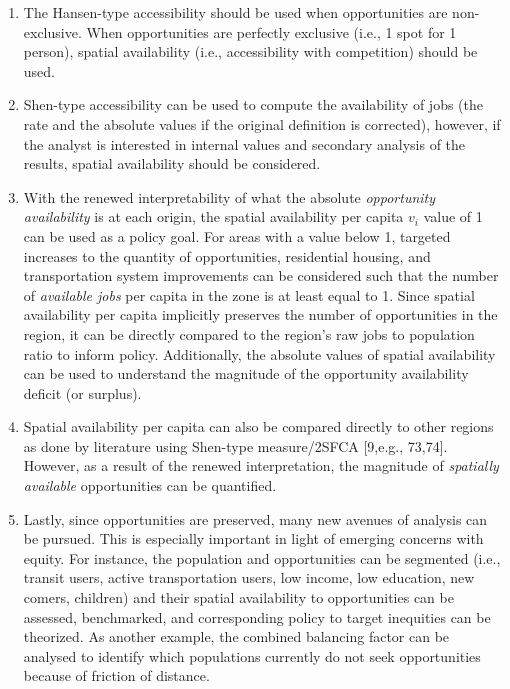 \documentclass[10pt,letterpaper]{article}
\begin{document}
\begin{enumerate}
\def\labelenumi{\arabic{enumi})}
\item
  The Hansen-type accessibility should be used when opportunities are
  non-exclusive. When opportunities are perfectly exclusive (i.e., 1
  spot for 1 person), spatial availability (i.e., accessibility with
  competition) should be used.
\item
  Shen-type accessibility can be used to compute the availability of
  jobs (the rate and the absolute values if the original definition is
  corrected), however, if the analyst is interested in internal values
  and secondary analysis of the results, spatial availability should be
  considered.
\item
  With the renewed interpretability of what the absolute
  \emph{opportunity availability} is at each origin, the spatial
  availability per capita \(v_i\) value of 1 can be used as a policy
  goal. For areas with a value below 1, targeted increases to the
  quantity of opportunities, residential housing, and transportation
  system improvements can be considered such that the number of
  \emph{available jobs} per capita in the zone is at least equal to 1.
  Since spatial availability per capita implicitly preserves the number
  of opportunities in the region, it can be directly compared to the
  region's raw jobs to population ratio to inform policy. Additionally,
  the absolute values of spatial availability can be used to understand
  the magnitude of the opportunity availability deficit (or surplus).
\item
  Spatial availability per capita can also be compared directly to other
  regions as done by literature using Shen-type measure/2SFCA {[}9,e.g.,
  73,74{]}. However, as a result of the renewed interpretation, the
  magnitude of \emph{spatially available} opportunities can be
  quantified.
\item
  Lastly, since opportunities are preserved, many new avenues of
  analysis can be pursued. This is especially important in light of
  emerging concerns with equity. For instance, the population and
  opportunities can be segmented (i.e., transit users, active
  transportation users, low income, low education, new comers, children)
  and their spatial availability to opportunities can be assessed,
  benchmarked, and corresponding policy to target inequities can be
  theorized. As another example, the combined balancing factor can be
  analysed to identify which populations currently do not seek
  opportunities because of friction of distance.
\end{enumerate}
\end{document}

